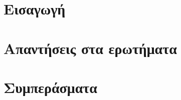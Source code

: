 \documentclass[12pt]{article}
\begin{document}
\tableofcontents


\listoffigures
 
\listoftables
\section{Εισαγωγή}

\section{Απαντήσεις στα ερωτήματα}
\subsection{}
\subsection{}

\section{Συμπεράσματα}
\end{document}
